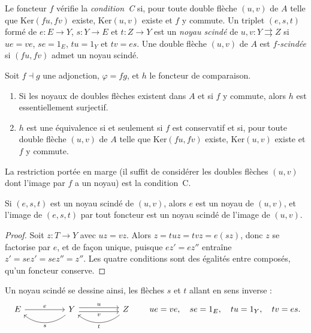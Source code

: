 \begin{definition}
Le foncteur $f$ vérifie la \emph{condition~C} si, pour toute double flèche $(u, v)$ de $A$ telle que $\mathrm{Ker}(fu, fv)$ existe, $\mathrm{Ker}(u, v)$ existe et $f$ y commute. Un triplet $(e, s, t)$ formé de $e : E \to Y$, $s : Y \to E$ et $t : Z \to Y$ est un \emph{noyau scindé} de $u, v : Y \rightrightarrows Z$ si $ue = ve$, $se = 1_E$, $tu = 1_Y$ et $tv = es$. Une double flèche $(u, v)$ de $A$ est \emph{$f$-scindée} si $(fu, fv)$ admet un noyau scindé.
\end{definition}

\begin{enonce}
Soit $f \dashv g$ une adjonction, $\varphi = fg$, et $h$ le foncteur de comparaison.
\begin{enumerate}
\item[a)] Si les noyaux de doubles flèches existent dans $A$ et si $f$ y commute, alors $h$ est essentiellement surjectif.
\item[b)] $h$ est une équivalence si et seulement si $f$ est conservatif et si, pour toute double flèche $(u, v)$ de $A$ telle que $\mathrm{Ker}(fu, fv)$ existe, $\mathrm{Ker}(u, v)$ existe et $f$ y commute.
\end{enumerate}
La restriction portée en marge (il suffit de considérer les doubles flèches $(u, v)$ dont l'image par $f$ a un noyau) est la condition~C.
\end{enonce}

\begin{lemme}\label{lem:19-scinde}
Si $(e, s, t)$ est un noyau scindé de $(u, v)$, alors $e$ est un noyau de $(u, v)$, et l'image de $(e, s, t)$ par tout foncteur est un noyau scindé de l'image de $(u, v)$.
\end{lemme}

\begin{proof}
Soit $z : T \to Y$ avec $uz = vz$. Alors $z = tuz = tvz = e(sz)$, donc $z$ se factorise par $e$, et de façon unique, puisque $ez' = ez''$ entraîne $z' = sez' = sez'' = z''$. Les quatre conditions sont des égalités entre composés, qu'un foncteur conserve.
\end{proof}

Un noyau scindé se dessine ainsi, les flèches $s$ et $t$ allant en sens inverse :
\[
\begin{tikzcd}[column sep=huge]
E \arrow[r, "e"] & Y \arrow[l, bend left=40, "s"] \arrow[r, shift left, "u"] \arrow[r, shift right, "v"'] & Z \arrow[l, bend left=40, "t"]
\end{tikzcd}
\qquad ue = ve, \quad se = 1_E, \quad tu = 1_Y, \quad tv = es.
\]

